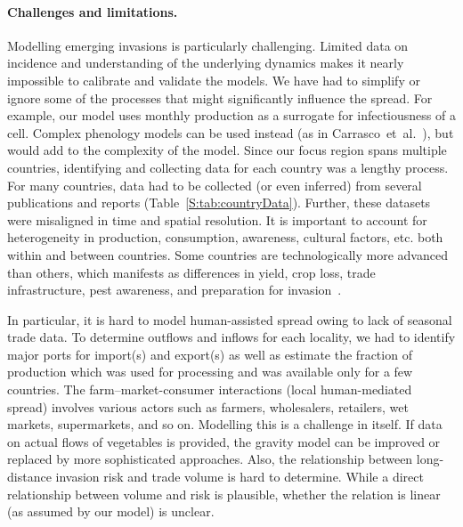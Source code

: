 \documentclass[11pt]{article}
\theoremstyle{definition}
\begin{document}
\paragraph{Challenges and limitations.} Modelling emerging invasions is
particularly challenging. Limited data on incidence and understanding of
the underlying dynamics makes it nearly impossible to calibrate and
validate the models.   We have had to simplify or ignore some of the
processes that might significantly influence the spread.  For example, our
model uses monthly production as a surrogate for infectiousness of a cell.
Complex phenology models can be used instead (as in
Carrasco~et~al.~\cite{carrasco2010unveiling}), but would add to the
complexity of the model.
Since our focus region spans multiple countries, identifying and collecting
data for each country was a lengthy process. For many countries, data had
to be collected (or even inferred) from several publications and reports
(Table~\ref{S:tab:countryData}). Further, these datasets were misaligned in
time and spatial resolution.  It is important to account for heterogeneity
in production, consumption, awareness, cultural factors, etc. both within
and between countries.  Some countries are technologically more advanced
than others, which manifests as differences in yield, crop loss, trade
infrastructure, pest awareness, and preparation for
invasion~\cite{early2016global}.

In particular, it is hard to model human-assisted spread owing to lack of
seasonal trade data. To determine outflows and inflows for each locality,
we had to identify major ports for import(s) and export(s) as well as
estimate the fraction of production which was used for processing and was
available only for a few countries. The farm--market-consumer interactions
(local human-mediated spread) involves various actors such as farmers,
wholesalers, retailers, wet markets, supermarkets, and so on. Modelling
this is a challenge in itself. If data on actual flows of vegetables is
provided, the gravity model can be improved or replaced by more
sophisticated approaches. Also, the relationship between long-distance
invasion risk and trade volume is hard to determine. While a direct
relationship between volume and risk is plausible, whether the relation is
linear (as assumed by our model) is unclear.
\end{document}
